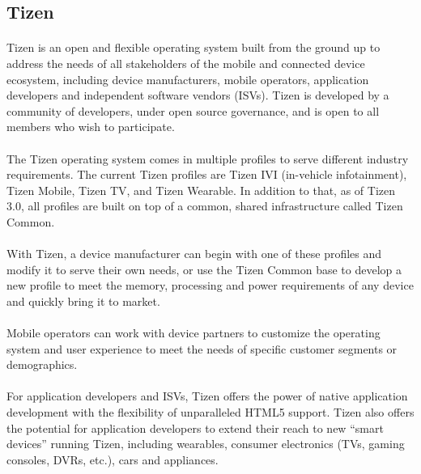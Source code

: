 \paragraph{}


\subsection{Tizen}

\paragraph{}
Tizen is an open and flexible operating system built from the ground up to address the needs of all stakeholders of the mobile and connected device ecosystem, including device manufacturers, mobile operators, application developers and independent software vendors (ISVs). Tizen is developed by a community of developers, under open source governance, and is open to all members who wish to participate.

\paragraph{}
The Tizen operating system comes in multiple profiles to serve different industry requirements. The current Tizen profiles are Tizen IVI (in-vehicle infotainment), Tizen Mobile, Tizen TV, and Tizen Wearable. In addition to that, as of Tizen 3.0, all profiles are built on top of a common, shared infrastructure called Tizen Common.

\paragraph{}
With Tizen, a device manufacturer can begin with one of these profiles and modify it to serve their own needs, or use the Tizen Common base to develop a new profile to meet the memory, processing and power requirements of any device and quickly bring it to market.

\paragraph{}
Mobile operators can work with device partners to customize the operating system and user experience to meet the needs of specific customer segments or demographics.

\paragraph{}
For application developers and ISVs, Tizen offers the power of native application development with the flexibility of unparalleled HTML5 support. Tizen also offers the potential for application developers to extend their reach to new “smart devices” running Tizen, including wearables, consumer electronics (TVs, gaming consoles, DVRs, etc.), cars and appliances.

